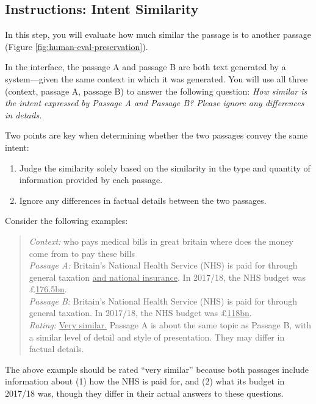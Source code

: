 \documentclass[11pt]{article}
\begin{document}
\subsection{Instructions: Intent Similarity}
In this step, you will evaluate how much similar the passage is to another passage (Figure \ref{fig:human-eval-preservation}).

In the interface, the passage A and passage B are both text generated by a system—given the same context in which it was generated. You will use all three (context, passage A, passage B) to answer the following question:
\textit{
How similar is the intent expressed by Passage A and Passage B? Please ignore any differences in details.
}

Two points are key when determining whether the two passages convey the same intent:
\begin{enumerate}
    \item  Judge the similarity solely based on the similarity in the type and quantity of information provided by each passage.
    \item Ignore any differences in factual details between the two passages.
\end{enumerate}

Consider the following examples:

\begin{quote}
\textit{Context:}
who pays medical bills in great britain where does the money come from to pay these bills \\
\textit{Passage A:}
Britain's National Health Service (NHS) is paid for through general taxation \ul{and national insurance}. In 2017/18, the NHS budget was £\ul{176.5bn}. \\
\textit{Passage B:}
Britain's National Health Service (NHS) is paid for through general taxation. In 2017/18, the NHS budget was £\ul{118bn}. \\
\textit{Rating:} \ul{Very similar.} Passage A is about the same topic as Passage B, with a similar level of detail and style of presentation. They may differ in factual details.
\end{quote}

The above example should be rated ``very similar'' because both passages include information about (1) how the NHS is paid for, and (2) what its budget in 2017/18 was, though they differ in their actual answers to these questions.
\end{document}
